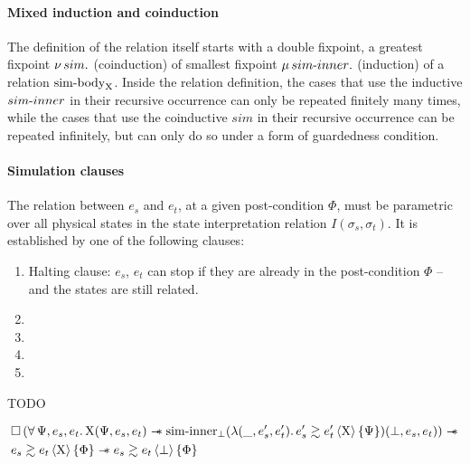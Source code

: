 \paragraph{Mixed induction and coinduction}
The definition of the relation itself starts with a double fixpoint, a greatest fixpoint $\operatorname{\nu} sim .$ (coinduction) of smallest fixpoint $\operatorname{\mu} {sim {\hbox{-}} inner} .$ (induction) of a relation $\mathrm{sim {\hbox{-}} body}_{\mathrm{X}}$. Inside the relation definition, the cases that use the inductive $sim {\hbox{-}} inner$ in their recursive occurrence can only be repeated finitely many times, while the cases that use the coinductive $sim$ in their recursive occurrence can be repeated infinitely, but can only do so under a form of guardedness condition.

\clearpage


\paragraph{Simulation clauses} The relation between $e_s$ and $e_t$, at a given post-condition $\Phi$, must be parametric over all physical states in the state interpretation relation $I(\sigma_s, \sigma_t)$. It is established by one of the following clauses:

\begin{enumerate}
\item[\circled{1}] Halting clause: $e_s$, $e_t$ can stop if they are already in the post-condition $\Phi$ -- and the states are still related.
\item[\circled{2}]
\item[\circled{3}]
\item[\circled{4}]
\item[\circled{5}]
\end{enumerate}




TODO

\clearpage

\begin{theorem}
    \begin{align*}
            &
            \iPersistent \left(
                \forall \Psi, e_s, e_t \ldotp
                \Chi (\Psi, e_s, e_t) \iSepImp
                \mathrm{sim \mathhyphen inner}_\bot (\lambdaAbs (\_, e_s', e_t') \ldotp \iSim[\Chi]{\Psi}{e_s'}{e_t'}) (\bot, e_s, e_t)
            \right) \iSepImp
        \\
            &
            \iSim[\Chi]{\Phi}{e_s}{e_t} \iSepImp
            \iSim[\bot]{\Phi}{e_s}{e_t}
    \end{align*}
\end{theorem}

